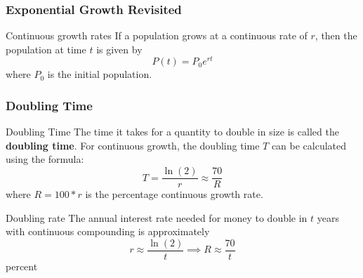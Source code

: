 \documentclass{beamer}
\begin{document}
\begin{frame}
  \frametitle{Exponential Growth Revisited} 
  \begin{block}{Continuous growth rates}
    If a population grows at a continuous rate of \(r\), then the population at time \(t\) is given by
    \[
      P(t) = P_{0}e^{rt}
    \]
    where \(P_{0}\) is the initial population.
    
  \end{block}
\end{frame}
\begin{frame}
  \frametitle{Doubling Time} 
  \begin{block}{Doubling Time}
    The time it takes for a quantity to double in size is called the \textbf{doubling time}. For continuous growth, the doubling time \(T\) can be calculated using the formula:
    \[
      T = \frac{\ln(2)}{r}  \approx \frac{70}{R}
    \]
    where \(R = 100*r \)  is the percentage continuous growth rate.
  \end{block}
  \begin{block}{Doubling rate}
    The annual interest rate needed for money to double in \(t\) years with continuous compounding is approximately 
    \[
      r \approx \frac{\ln(2)}{t}   \implies R \approx \frac{70}{t}
    \]
    percent
  \end{block}
\end{frame}
\end{document}

